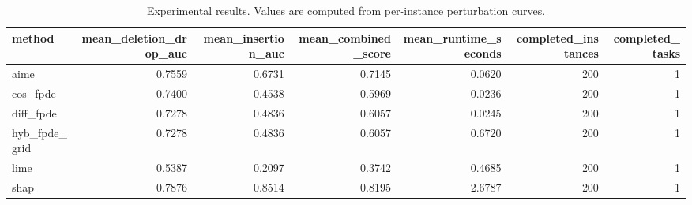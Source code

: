 \begin{table}[t]
\caption{Experimental results. Values are computed from per-instance perturbation curves.}
\label{tab:main_results_computed}
\centering
\begin{tabular}{lrrrrrr}
\toprule
method & mean\_deletion\_drop\_auc & mean\_insertion\_auc & mean\_combined\_score & mean\_runtime\_seconds & completed\_instances & completed\_tasks \\
\midrule
aime & 0.7559 & 0.6731 & 0.7145 & 0.0620 & 200 & 1 \\
cos\_fpde & 0.7400 & 0.4538 & 0.5969 & 0.0236 & 200 & 1 \\
diff\_fpde & 0.7278 & 0.4836 & 0.6057 & 0.0245 & 200 & 1 \\
hyb\_fpde\_grid & 0.7278 & 0.4836 & 0.6057 & 0.6720 & 200 & 1 \\
lime & 0.5387 & 0.2097 & 0.3742 & 0.4685 & 200 & 1 \\
shap & 0.7876 & 0.8514 & 0.8195 & 2.6787 & 200 & 1 \\
\bottomrule
\end{tabular}

\end{table}
